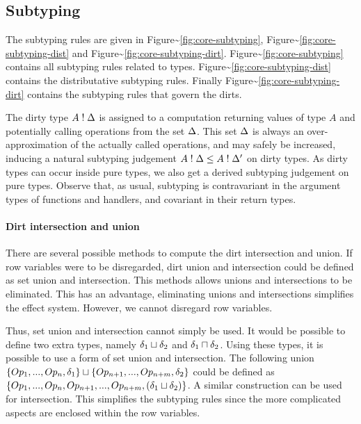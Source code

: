 \documentclass[master=cws,masteroption=ai, english]{kulemt}
\begin{document}
\subsection{Subtyping}\label{subtyping-1}

The subtyping rules are given in
Figure\textasciitilde{}\ref{fig:core-subtyping},
Figure\textasciitilde{}\ref{fig:core-subtyping-dist} and
Figure\textasciitilde{}\ref{fig:core-subtyping-dirt}.
Figure\textasciitilde{}\ref{fig:core-subtyping} contains all subtyping
rules related to types.
Figure\textasciitilde{}\ref{fig:core-subtyping-dist} contains the
distributative subtyping rules. Finally
Figure\textasciitilde{}\ref{fig:core-subtyping-dirt} contains the
subtyping rules that govern the dirts.

The dirty type \(A \mathrel{!} \Delta\) is assigned to a computation returning
values of type \(A\) and potentially calling operations from the set
\(\Delta\). This set \(\Delta\) is always an over-approximation of the
actually called operations, and may safely be increased, inducing a
natural subtyping judgement \(A \mathrel{!} \Delta \leq A \mathrel{!} \Delta'\) on dirty
types. As dirty types can occur inside pure types, we also get a derived
subtyping judgement on pure types. Observe that, as usual, subtyping is
contravariant in the argument types of functions and handlers, and
covariant in their return types.

\paragraph{Dirt intersection and union}

There are several possible methods to compute the dirt intersection and
union. If row variables were to be disregarded, dirt union and
intersection could be defined as set union and intersection. This
methods allows unions and intersections to be eliminated. This has an
advantage, eliminating unions and intersections simplifies the effect
system. However, we cannot disregard row variables.

Thus, set union and intersection cannot simply be used. It would be
possible to define two extra types, namely \(\delta_1 \sqcup \delta_2\)
and \(\delta_1 \sqcap \delta_2\). Using these types, it is
possible to use a form of set union and intersection. The following
union
\(\{Op_1, ..., Op_n, \delta_1\} \sqcup \{Op_{n+1}, ..., Op_{n+m}, \delta_2\}\)
could be defined as
\(\{Op_1, ..., Op_n, Op_{n+1}, ..., Op_{n+m}, (\delta_1 \sqcup \delta_2)\}\).
A similar construction can be used for intersection. This simplifies the
subtyping rules since the more complicated aspects are enclosed within
the row variables.
\end{document}
